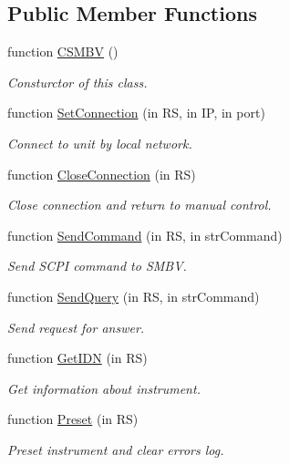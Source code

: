 \subsection*{Public Member Functions}
\begin{DoxyCompactItemize}
\item 
function \hyperlink{class_c_s_m_b_v_a10fbb6e63902d0c1dddd9e792dac6fa3}{C\-S\-M\-B\-V} ()
\begin{DoxyCompactList}\small\item\em Consturctor of this class. \end{DoxyCompactList}\item 
function \hyperlink{class_c_s_m_b_v_ae85fc05ea34a19b1b42a90af475690bf}{Set\-Connection} (in R\-S, in I\-P, in port)
\begin{DoxyCompactList}\small\item\em Connect to unit by local network. \end{DoxyCompactList}\item 
function \hyperlink{class_c_s_m_b_v_a9ab41634cbc045056bc78650d56854ac}{Close\-Connection} (in R\-S)
\begin{DoxyCompactList}\small\item\em Close connection and return to manual control. \end{DoxyCompactList}\item 
function \hyperlink{class_c_s_m_b_v_a5b025e39750835c37cd70806435bda33}{Send\-Command} (in R\-S, in str\-Command)
\begin{DoxyCompactList}\small\item\em Send S\-C\-P\-I command to S\-M\-B\-V. \end{DoxyCompactList}\item 
function \hyperlink{class_c_s_m_b_v_a53761b9f51f91fd6b38d3b3ec117e813}{Send\-Query} (in R\-S, in str\-Command)
\begin{DoxyCompactList}\small\item\em Send request for answer. \end{DoxyCompactList}\item 
function \hyperlink{class_c_s_m_b_v_a6d5f7bb3b1af3a752aad78f6b36b755a}{Get\-I\-D\-N} (in R\-S)
\begin{DoxyCompactList}\small\item\em Get information about instrument. \end{DoxyCompactList}\item 
function \hyperlink{class_c_s_m_b_v_a0c6e9619aa4cf9464edc512b2b557dec}{Preset} (in R\-S)
\begin{DoxyCompactList}\small\item\em Preset instrument and clear errors log. \end{DoxyCompactList}\item 

\end{DoxyCompactItemize}

